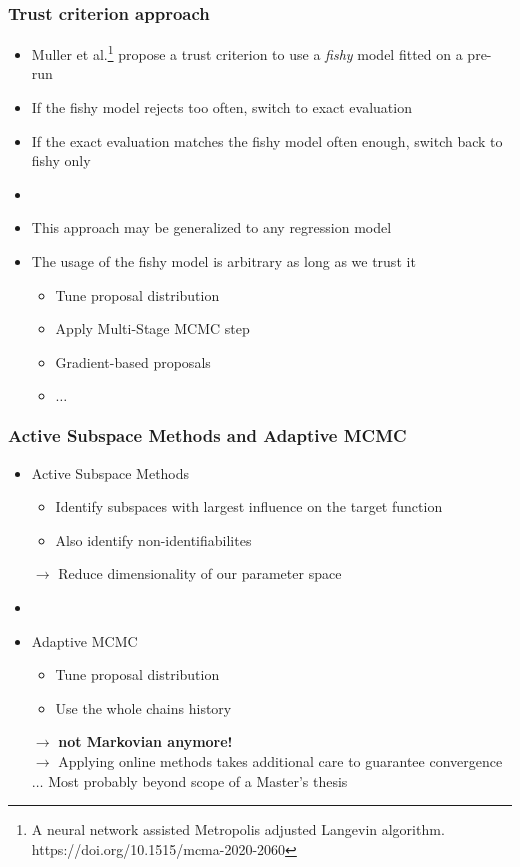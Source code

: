 \begin{frame}
    \frametitle{Trust criterion approach}
    \begin{itemize}
	\item Muller et al.\footnote{A neural network assisted Metropolis adjusted Langevin algorithm. https://doi.org/10.1515/mcma-2020-2060} propose 
	    a trust criterion to use a \textit{fishy} model fitted on a pre-run
	\item If the fishy model rejects too often, switch to exact evaluation
	\item If the exact evaluation matches the fishy model often enough, switch back to fishy only
	\item[]
	\item This approach may be generalized to any regression model
	\item The usage of the fishy model is arbitrary as long as we trust it
	\begin{itemize}
	    \item Tune proposal distribution
	    \item Apply Multi-Stage MCMC step
	    \item Gradient-based proposals
	    \item $\dots$
	\end{itemize}
    \end{itemize}
\end{frame}

\begin{frame}
    \frametitle{Active Subspace Methods and Adaptive MCMC}
    \begin{itemize}
	\item Active Subspace Methods 
	\begin{itemize}
	    \item Identify subspaces with largest influence on the target function
	    \item Also identify non-identifiabilites 
	\end{itemize}
	$\to$ Reduce dimensionality of our parameter space
	\item[]
	\item Adaptive MCMC 
	\begin{itemize}
	    \item Tune proposal distribution
	    \item Use the whole chains history
	\end{itemize}
	$\to$ \textbf{not Markovian anymore!} \\
	$\to$ Applying online methods takes additional care to guarantee convergence \\ \vspace{1mm}
	$\dots$ Most probably beyond scope of a Master's thesis
    \end{itemize}
\end{frame}

